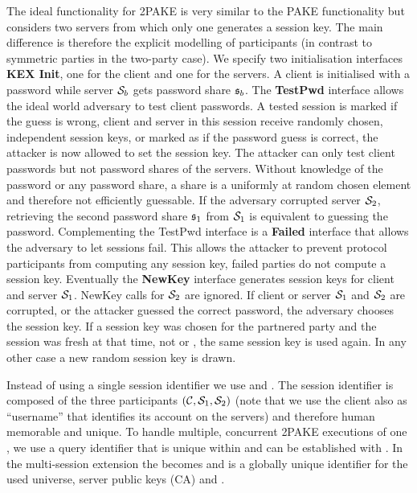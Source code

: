 The ideal functionality for \ac{2PAKE} is very similar to the \ac{PAKE} functionality but considers two servers from which only one generates a session key.
The main difference is therefore the explicit modelling of participants (in contrast to symmetric parties in the two-party case).
We specify two initialisation interfaces \textbf{KEX Init}, one for the client and one for the servers.
A client is initialised with a password \pwd while server $\mathcal{S}_b$ gets password share $\mathfrak{s}_b$.
The \textbf{TestPwd} interface allows the ideal world adversary to test client passwords.
A tested session is marked \interrupted if the guess is wrong, \ie client and server in this session receive randomly chosen, independent session keys, or marked as \compromised if the password guess is correct, \ie the attacker is now allowed to set the session key.
The attacker can only test client passwords but not password shares of the servers.
Without knowledge of the password or any password share, a share is a uniformly at random chosen element and therefore not efficiently guessable.
If the adversary corrupted server $\mathcal{S}_2$, retrieving the second password share $\mathfrak{s}_1$ from $\mathcal{S}_1$ is equivalent to guessing the password.
Complementing the TestPwd interface is a \textbf{Failed} interface that allows the adversary to let sessions fail.
This allows the attacker to prevent protocol participants from computing any session key, \ie failed parties do not compute a session key.
Eventually the \textbf{NewKey} interface generates session keys for client \Client and server $\mathcal{S}_1$.
NewKey calls for $\mathcal{S}_2$ are ignored.
If client \Client or server $\mathcal{S}_1$ and $\mathcal{S}_2$ are corrupted, or the attacker guessed the correct password, the adversary chooses the session key.
If a session key was chosen for the partnered party and the session was fresh at that time, \ie not \compromised or \interrupted, the same session key is used again.
In any other case a new random session key is drawn.

Instead of using a single session identifier \sid we use \sid and \qid.
The session identifier \sid is composed of the three participants $(\mathcal{C}, \mathcal{S}_1, \mathcal{S}_2)$ (note that we use the client \Client also as ``username'' that identifies its account on the servers) and therefore human memorable and unique.
To handle multiple, concurrent \ac{2PAKE} executions of one \sid, we use a query identifier \qid that is unique within \sid and can be established with \Finit.
In the multi-session extension \FTWOPAKEM the \sid becomes \ssid and \sid is a globally unique identifier for the used universe, \ie server public keys (\ac{CA}) and \crs.


